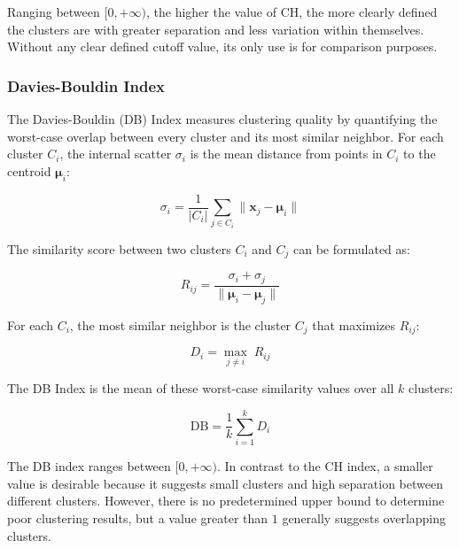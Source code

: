 Ranging between $[0, +\infty)$, the higher the value of CH, the more clearly defined the clusters are with greater separation and less variation within themselves. Without any clear defined cutoff value, its only use is for comparison purposes.

\subsubsection*{Davies-Bouldin Index}

The Davies-Bouldin (DB) Index \cite{davies1979} measures clustering quality by quantifying the worst-case overlap between every cluster and its most similar neighbor. For each cluster $C_i$, the internal scatter $\sigma_i$ is the mean distance from points in $C_i$ to the centroid $\boldsymbol{\mu}_i$:

\begin{equation}
    \sigma_i = \frac{1}{|C_i|} \sum_{j \in C_i} \|\mathbf{x}_j - \boldsymbol{\mu}_i\|
    \label{eq:db_sigma}
\end{equation}

The similarity score between two clusters $C_i$ and $C_j$ can be formulated as:

\begin{equation}
    R_{ij} = \frac{\sigma_i + \sigma_j}{\|\boldsymbol{\mu}_i - \boldsymbol{\mu}_j\|}
    \label{eq:db_Rij}
\end{equation}

For each $C_i$, the most similar neighbor is the cluster $C_j$ that maximizes $R_{ij}$:

\begin{equation}
    D_i = \max_{j \neq i}\; R_{ij}
    \label{eq:db_Di}
\end{equation}

The DB Index is the mean of these worst-case similarity values over all $k$ clusters:

\begin{equation}
    \mathrm{DB} = \frac{1}{k} \sum_{i=1}^{k} D_i
    \label{eq:db}
\end{equation}

\clearpage

The DB index ranges between $[0, +\infty)$. In contrast to the CH index, a smaller value is desirable because it suggests small clusters and high separation between different clusters. However, there is no predetermined upper bound to determine poor clustering results, but a value greater than $1$ generally suggests overlapping clusters.

